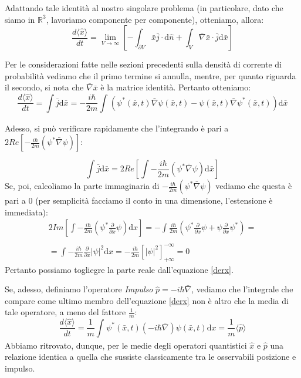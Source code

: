 Adattando tale identità al nostro singolare problema (in particolare, dato che siamo in $\mathbb{R}^3$, lavoriamo componente per componente), otteniamo, allora:
\begin{equation}
\frac{d\langle \hat x\rangle}{dt}=\lim_{V\to \infty}{\left[-\int_{\partial V}^{}{\bar x \bar j \cdot \textrm{d}\hat n}+\int_{V}^{}{\bar \nabla \bar x\cdot \bar j \textrm{d}\bar x}\right]}\end{equation}

Per le considerazioni fatte nelle sezioni precedenti sulla densità di corrente di probabilità vediamo che il primo termine si annulla, mentre, per quanto riguarda il secondo, si nota che $\bar \nabla \bar x $ è la matrice identità. Pertanto otteniamo:
\begin{equation} \label{memom}
\frac{d\langle \hat x\rangle}{dt}=\int{\bar j \textrm{d}\bar x}=-\frac{i\hbar }{2m}\int_{}^{}{\left(\psi ^*\left(\bar x,t\right)\bar \nabla \psi\left(\bar x,t\right) -\psi\left(\bar x,t\right) \bar \nabla \psi ^*\left(\bar x,t\right)\right) \textrm{d}\bar x}\end{equation}

Adesso, si può verificare rapidamente che l'integrando è pari a $2Re\left[-\frac{i\hbar}{2m}\left(\psi^*\bar\nabla\psi\right)\right]$:

\begin{equation} \label{derx}
\int{\bar j \textrm{d}\bar x}=2Re\left[\int{-\frac{i\hbar }{2m}\left(\psi^*\bar\nabla\psi\right)\textrm{d}\bar x}\right]
\end{equation}
 Se, poi, calcoliamo la parte immaginaria di $-\frac{i\hbar}{2m}\left(\psi^*\bar\nabla\psi\right)$ vediamo che questa è pari a 0 (per semplicità facciamo il conto in una dimensione, l'estensione è immediata):
\begin{equation}
\begin{array}{l}
2Im\left[\int{-\frac{i\hbar }{2m}\left(\psi^*\frac{\partial}{\partial x}\psi\right)\textrm{d}x}\right]= 
-\int{\frac{i\hbar}{2m}\left(\psi ^*\frac{\partial}{\partial x}\psi+\psi\frac{\partial}{\partial x}\psi ^*\right)}= 
\\ \\ =\int{-\frac{i\hbar}{2m}\frac{\partial}{\partial x}|\psi|^2\textrm{d}x}=-\frac{i\hbar}{2m}\left[|\psi|^2\right]^{-\infty}_{+\infty} = 0
\end{array}
\end{equation}
Pertanto possiamo togliegre la parte reale dall'equazione \eqref{derx}.

Se, adesso, definiamo l'operatore \emph{Impulso} $\hat p=-i\hbar \bar\nabla$, vediamo che l'integrale che compare come ultimo membro dell'equazione \eqref{derx} non è altro che la media di tale operatore, a meno del fattore $\frac{1}{m}$:
\begin{equation}
\frac{d\langle \hat x\rangle}{dt}=\frac{1}{m}\int_{}^{}{\psi ^*\left(\bar x,t\right)\left(-i\hbar \bar \nabla \right)\psi \left(\bar x,t\right)\textrm{d}x}=\frac{1}{m}\langle \hat p\rangle
\end{equation}
Abbiamo ritrovato, dunque, per le medie degli operatori quantistici $\hat x$ e $\hat p$ una relazione identica a quella che sussiste classicamente tra le osservabili posizione e impulso.
\\


